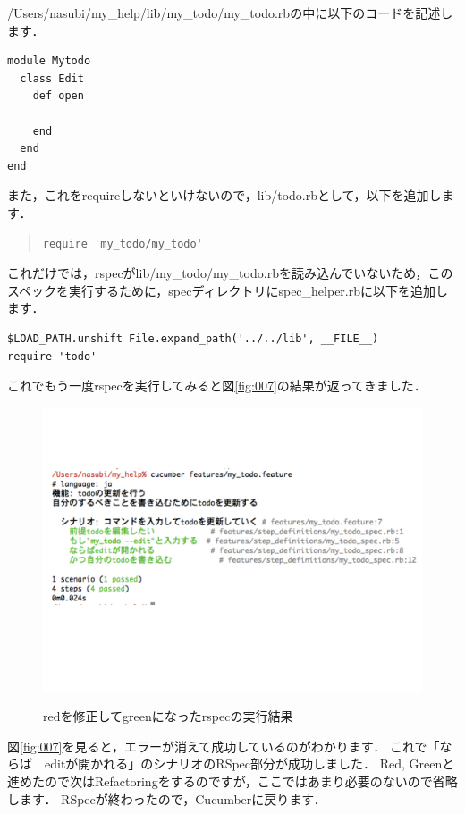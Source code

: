 /Users/nasubi/my\_help/lib/my\_todo/my\_todo.rbの中に以下のコードを記述します．
\begin{lstlisting}[style=customCsh,basicstyle={\scriptsize\ttfamily}]
module Mytodo
  class Edit
    def open

    end
  end
end
\end{lstlisting}
また，これをrequireしないといけないので，lib/todo.rbとして，以下を追加します．
\begin{quote}\begin{verbatim}
require 'my_todo/my_todo'
\end{verbatim}\end{quote}
これだけでは，rspecがlib/my\_todo/my\_todo.rbを読み込んでいないため，このスペックを実行するために，specディレクトリにspec\_helper.rbに以下を追加します．
\begin{lstlisting}[style=customCsh,basicstyle={\scriptsize\ttfamily}]
$LOAD_PATH.unshift File.expand_path('../../lib', __FILE__)
require 'todo'
\end{lstlisting}
これでもう一度rspecを実行してみると図\ref{fig:007}の結果が返ってきました．

\begin{figure}[htbp]\begin{center}
\includegraphics[width=12cm,bb= 0 0 937 753]{../figs/./my_help_nasu.007.jpeg}
\caption{redを修正してgreenになったrspecの実行結果}
\label{fig:007}
\label{default}\end{center}\end{figure}
図\ref{fig:007}を見ると，エラーが消えて成功しているのがわかります．
これで「ならば　editが開かれる」のシナリオのRSpec部分が成功しました．
Red, Greenと進めたので次はRefactoringをするのですが，ここではあまり必要のないので省略します．
RSpecが終わったので，Cucumberに戻ります．

